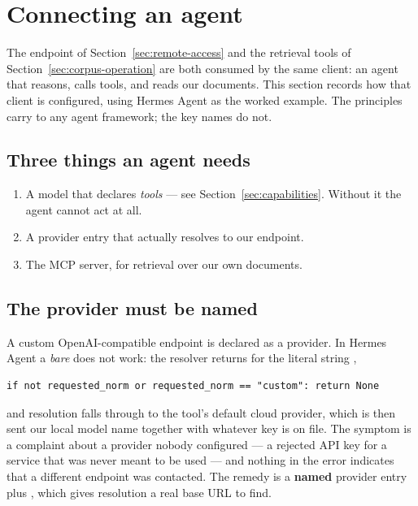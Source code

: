 \section{Connecting an agent}
\label{sec:agent-integration}

The endpoint of Section~\ref{sec:remote-access} and the retrieval tools of
Section~\ref{sec:corpus-operation} are both consumed by the same client: an
agent that reasons, calls tools, and reads our documents. This section records
how that client is configured, using Hermes Agent as the worked example. The
principles carry to any agent framework; the key names do not.

\subsection{Three things an agent needs}

\begin{enumerate}
  \item A model that declares \textit{tools} --- see
        Section~\ref{sec:capabilities}. Without it the agent cannot act at all.
  \item A provider entry that actually resolves to our endpoint.
  \item The MCP server, for retrieval over our own documents.
\end{enumerate}

\subsection{The provider must be named}

A custom OpenAI-compatible endpoint is declared as a provider. In Hermes Agent
a \textit{bare}  does not work: the resolver returns
 for the literal string ,

\begin{lstlisting}
if not requested_norm or requested_norm == "custom": return None
\end{lstlisting}

and resolution falls through to the tool's default cloud provider, which is
then sent our local model name together with whatever key is on file. The
symptom is a complaint about a provider nobody configured --- a rejected API
key for a service that was never meant to be used --- and nothing in the error
indicates that a different endpoint was contacted. The remedy is a
\textbf{named} provider entry plus , which gives resolution a
real base URL to find.


